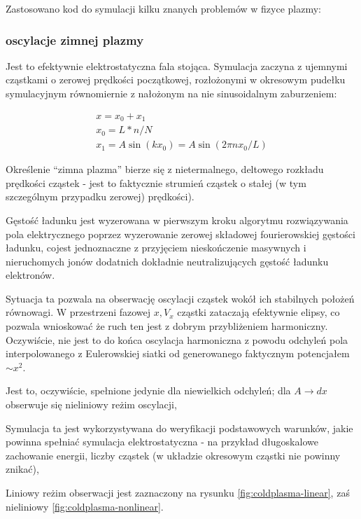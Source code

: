     Zastosowano kod do symulacji kilku znanych problemów w fizyce plazmy:
    \subsubsection{oscylacje zimnej plazmy}
    Jest to efektywnie elektrostatyczna fala stojąca. Symulacja zaczyna z ujemnymi cząstkami
o zerowej prędkości początkowej, rozłożonymi w okresowym pudełku symulacyjnym
równomiernie z nałożonym na nie sinusoidalnym zaburzeniem:

\begin{align}
x = x_0 + x_1\\
x_0 = L * n / N\\
x_1 = A  \sin(k x_0)=A \sin(2 \pi n x_0 / L)
\end{align}

Określenie ``zimna plazma'' bierze się z nietermalnego, deltowego
rozkładu prędkości cząstek - jest to faktycznie strumień cząstek o stałej
(w tym szczególnym przypadku zerowej) prędkości).

Gęstość ładunku jest wyzerowana w pierwszym kroku algorytmu rozwiązywania pola elektrycznego
poprzez wyzerowanie zerowej składowej fourierowskiej gęstości ładunku, cojest jednoznaczne
z przyjęciem nieskończenie masywnych i nieruchomych jonów dodatnich dokładnie neutralizujących gęstość
ładunku elektronów.

Sytuacja ta
pozwala na obserwację oscylacji cząstek wokół ich stabilnych położeń
równowagi. W przestrzeni fazowej $x, V_x$ cząstki zataczają efektywnie
elipsy, co pozwala wnioskować że ruch ten jest z dobrym przybliżeniem harmoniczny.
Oczywiście, nie jest to do końca oscylacja harmoniczna z powodu odchyleń pola interpolowanego
z Eulerowskiej siatki od generowanego faktycznym potencjałem $ \sim x^2 $.

Jest to, oczywiście, spełnione jedynie dla niewielkich odchyleń; dla $A \to
dx$  obserwuje się nieliniowy reżim oscylacji, 

Symulacja ta jest wykorzystywana do weryfikacji podstawowych warunków, jakie powinna spełniać
symulacja elektrostatyczna - na przykład długoskalowe zachowanie energii, liczby cząstek (w układzie okresowym cząstki nie powinny
znikać), %

Liniowy reżim obserwacji jest zaznaczony na rysunku
\ref{fig:coldplasma-linear}, zaś nieliniowy \ref{fig:coldplasma-nonlinear}.

